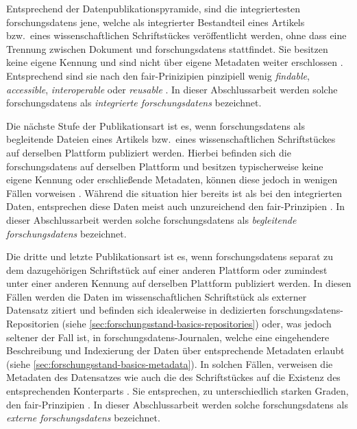 Entsprechend der Datenpublikationspyramide, sind die integriertesten \glspl{forschungsdaten} jene, welche als integrierter Bestandteil eines Artikels bzw.~eines wissenschaftlichen Schriftstückes veröffentlicht werden, ohne dass eine Trennung zwischen Dokument und \glspl{forschungsdaten} stattfindet.
Sie besitzen keine eigene Kennung und sind nicht über eigene Metadaten weiter erschlossen \autocite{ReillyEtAl2011}.
Entsprechend sind sie nach den \gls{fair}-Prinizipien pinzipiell wenig \textit{findable}, \textit{accessible}, \textit{interoperable} oder \textit{reusable} \autocite[vgl.][]{ReillyEtAl2011}.
In dieser Abschlussarbeit werden solche \glspl{forschungsdaten} als \textit{integrierte \glspl{forschungsdaten}} bezeichnet.

Die nächste Stufe der Publikationsart ist es, wenn \glspl{forschungsdaten} als begleitende Dateien eines Artikels bzw.~eines wissenschaftlichen Schriftstückes auf derselben Plattform publiziert werden.
Hierbei befinden sich die \glspl{forschungsdaten} auf derselben Plattform und besitzen typischerweise keine eigene Kennung oder erschließende Metadaten, können diese jedoch in wenigen Fällen vorweisen \autocite{ReillyEtAl2011}.
Während die situation hier bereits ist als bei den integrierten Daten, entsprechen diese Daten meist auch unzureichend den \gls{fair}-Prinzipien \autocite[vgl.][]{ReillyEtAl2011}.
In dieser Abschlussarbeit werden solche \glspl{forschungsdaten} als \textit{begleitende \glspl{forschungsdaten}} bezeichnet.

Die dritte und letzte Publikationsart ist es, wenn \glspl{forschungsdaten} separat zu dem dazugehörigen Schriftstück auf einer anderen Plattform oder zumindest unter einer anderen Kennung auf derselben Plattform publiziert werden.
In diesen Fällen werden die Daten im wissenschaftlichen Schriftstück als externer Datensatz zitiert und befinden sich idealerweise in dedizierten \glspl{forschungsdaten}-Repositorien (siehe \cref{sec:forschungsstand-basics-repositories}) oder, was jedoch seltener der Fall ist, in \glspl{forschungsdaten}-Journalen, welche eine eingehendere Beschreibung und Indexierung der Daten über entsprechende Metadaten erlaubt (siehe \cref{sec:forschungsstand-basics-metadata}).
In solchen Fällen, verweisen die Metadaten des Datensatzes wie auch die des Schriftstückes auf die Existenz des entsprechenden Konterparts \autocite{ReillyEtAl2011}.
Sie entsprechen, zu unterschiedlich starken Graden, den \gls{fair}-Prinzipien \autocite[vgl.][]{ReillyEtAl2011}.
In dieser Abschlussarbeit werden solche \glspl{forschungsdaten} als \textit{externe \glspl{forschungsdaten}} bezeichnet.

